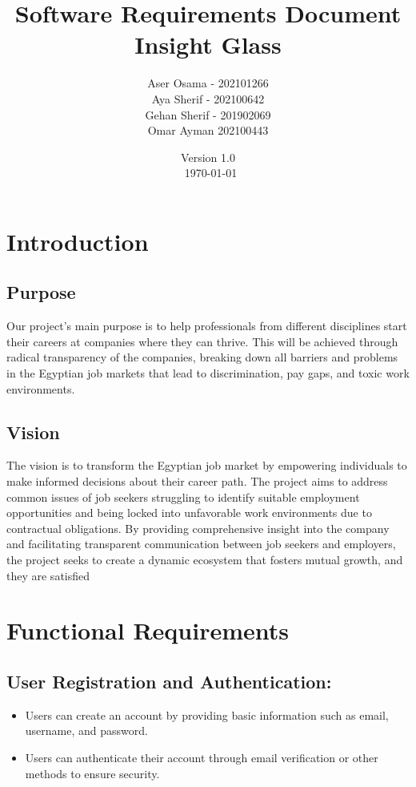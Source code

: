 \documentclass[titlepage]{article}
\begin{document}
\title{Software Requirements Document\\ \textbf{Insight Glass}}
\author{Aser Osama - 202101266 \\ Aya Sherif - 202100642 \\ Gehan Sherif - 201902069 \\ Omar Ayman 202100443 }
\date{Version 1.0 \\\ \today}


\maketitle
\tableofcontents


\newpage


\section{Introduction}
\subsection{Purpose}
Our project's main purpose is to help professionals from different disciplines start their careers at companies where 
they can thrive. This will be achieved through radical transparency of the companies, breaking down all barriers 
and problems in the Egyptian job markets that lead to discrimination, pay gaps, and toxic work environments.


\subsection{Vision}
The vision is to transform the Egyptian job market by empowering individuals to make informed decisions about their 
career path. The project aims to address common issues of job seekers struggling to identify suitable employment 
opportunities and being locked into unfavorable work environments due to contractual obligations. By providing 
comprehensive insight into the company and facilitating transparent communication between job seekers and 
employers, the project seeks to create a dynamic ecosystem that fosters mutual growth, and they are satisfied 

\section{Functional Requirements}
\subsection{User Registration and Authentication:}
\begin{itemize}
    \item Users can create an account by providing basic information such as email, username, and password.
    \item Users can authenticate their account through email verification or other methods to ensure security.
\end{itemize}
\end{document}
